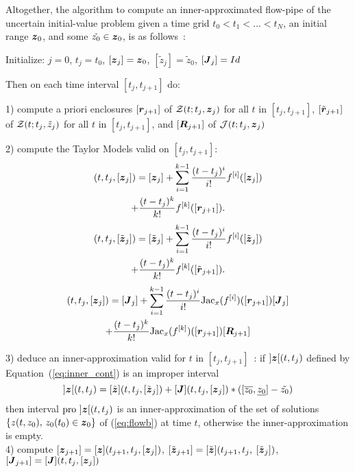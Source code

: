 \documentclass{sig-alternate-05-2015} %
\newcommand{\pro}{\mbox{pro }}
\begin{document}
Altogether, the algorithm to compute an inner-approxima\-ted flow-pipe of the uncertain initial-value problem given a time grid  $t_0 < t_1 < \ldots < t_N$, 
an initial range $\z_0$, and some $\tilde{z_0} \in \z_0$, is as follows~:
 {\par\smallskip                     %
  \begin{center}%
   \fbox%
   {\parbox{1.\linewidth}%
    { %
Initialize: $j=0$, $t_j=t_0$, $[\z_j]=\z_0$, $[\tilde{z}_j]=\tilde{z}_0$, $[\J_j] = Id$

Then on each time interval $[t_j,t_{j+1}]$ do:

1) compute a priori enclosures $[\r_{j+1}]$  of  ${\cal Z}(t;t_j,\z_j)$ for all $t$ in $[t_j,t_{j+1}]$, $[\tilde{\r}_{j+1}]$  of  ${\cal Z}(t;t_j,\tilde{z}_j)$ for all $t$ in $[t_j,t_{j+1}]$,
and $[\bfm{R}_{j+1}]$ of ${\cal J}(t;t_j,\z_j)$

2) compute the Taylor Models valid on $[t_j,t_{j+1}]$:
\begin{multline}
[\z](t,t_j,[{\z}_j]) = [{\z}_j] + \sum\limits_{i=1}^{k-1} \frac{(t-t_j)^i}{i !} f^{[i]}([{\z}_j])\\+ 
\frac{(t-t_j)^k}{k !} f^{[k]}([{\r}_{j+1}]).
\label{eq:TM1}
\end{multline}
\begin{multline}
[\tilde{\z}](t,t_j,[\tilde{\z}_j]) = [\tilde{\z}_j] + \sum\limits_{i=1}^{k-1} \frac{(t-t_j)^i}{i !} f^{[i]}([\tilde{\z}_j])\\+ \frac{(t-t_j)^k}{k !} f^{[k]}([\tilde{\r}_{j+1}]).
\label{eq:TM2}
\end{multline}
\begin{multline}
[\J](t,t_j,[{\z}_j]) = [{\J}_j] + \sum\limits_{i=1}^{k-1} \frac{(t-t_j)^i}{i !} \mbox{Jac}_x(f^{[i]})([{\r}_{j+1}]) [{\J}_j] \\ +  \frac{(t-t_j)^k}{k !} \mbox{Jac}_x(f^{[k]})([{\r}_{j+1}]) [\bfm{R}_{j+1}]
\label{eq:TM3}
\end{multline}

3) deduce an inner-approximation valid for $t$ in $[t_j,t_{j+1}]$~: if $]\z[(t,t_j)$ defined by Equation~(\ref{eq:inner_cont}) is an improper interval\\
\begin{equation} 
]\z[(t,t_j) = [\tilde{\z}](t,t_j,[\tilde{\z}_j]) + [\J](t,t_j,[{\z}_j])*([\overline{z_0},\underline{z_0}]-\tilde{z_0}) 
\label{eq:inner_cont}
\end{equation}
\noindent 
then interval $\pro]\z[(t,t_j)$ is an inner-approximation of  the set of solutions $\{ z(t,z_0), \, z_0(t_0) \in \z_0 \}$ of  (\ref{eq:flowb}) at time $t$,
otherwise the inner-approximation is empty.\\

4) compute $[{\z}_{j+1}]=[\z](t_{j+1},t_j,[{\z}_j])$, $[\tilde{\z}_{j+1}]=[\tilde{\z}](t_{j+1},t_j,$ $[\tilde{\z}_j])$, $[\J_{j+1}] = [\J](t,t_j,[{\z}_j]) $\\
 }%
   }%
  \end{center}%
  \par\smallskip                     %
 }        
\end{document}
